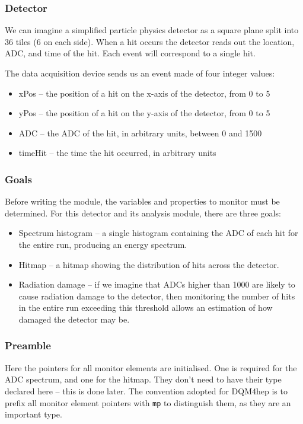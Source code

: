 
\subsubsection{Detector}
We can imagine a simplified particle physics detector as a square plane split into 36 tiles (6 on each side). When a hit occurs the detector reads out the location, \acrshort{ADC}, and time of the hit. Each event will correspond to a single hit.

The data acquisition device sends us an event made of four integer values:

\begin{itemize}
	\item xPos -- the position of a hit on the x-axis of the detector, from 0 to 5
	\item yPos -- the position of a hit on the y-axis of the detector, from 0 to 5
	\item ADC -- the \acrshort{ADC} of the hit, in arbitrary units, between 0 and 1500
	\item timeHit -- the time the hit occurred, in arbitrary units
\end{itemize}

\subsubsection{Goals}
Before writing the module, the variables and properties to monitor must be determined. For this detector and its analysis module, there are three goals:

\begin{itemize}
	\item Spectrum histogram -- a single histogram containing the \acrshort{ADC} of each hit for the entire run, producing an energy spectrum.
	\item Hitmap -- a hitmap showing the distribution of hits across the detector.
	\item Radiation damage -- if we imagine that \acrshort{ADC}s higher than 1000 are likely to cause radiation damage to the detector, then monitoring the number of hits in the entire run exceeding this threshold allows an estimation of how damaged the detector may be.
\end{itemize}

\subsubsection{Preamble}
Here the pointers for all monitor elements are initialised. One is required for the \acrshort{ADC} spectrum, and one for the hitmap. They don't need to have their type declared here -- this is done later. The convention adopted for \acrshort{DQM4hep} is to prefix all monitor element pointers with \texttt{m\textunderscore p} to distinguish them, as they are an important type.

